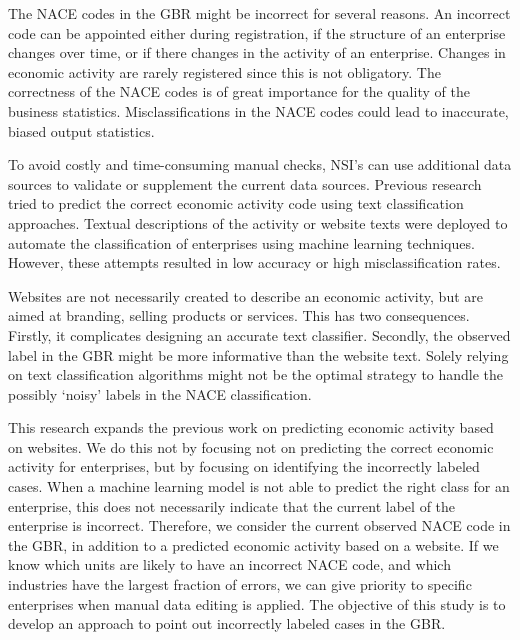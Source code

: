 \documentclass[12pt, a4paper, titlepage]{article}
\begin{document}
The NACE codes in the GBR might be incorrect for several reasons. An incorrect code can be appointed either during registration, if the structure of an enterprise changes over time, or if there changes in the activity of an enterprise. Changes in economic activity are rarely registered \citep{Christensen2008, DeldenScholtusBurger} since this is not obligatory. The correctness of the NACE codes is of great importance for the quality of the business statistics. Misclassifications in the NACE codes could lead to inaccurate, biased output statistics.

To avoid costly and time-consuming manual checks, NSI’s can use additional data sources to validate or supplement the current data sources. Previous research tried to predict the correct economic activity code using text classification approaches. Textual descriptions of the activity \citep{Caterini} or website texts \citep{Roelands, Berardi, Heidi} were deployed to automate the classification of enterprises using machine learning techniques. However, these attempts resulted in low accuracy or high misclassification rates. 

Websites are not necessarily created to describe an economic activity, but are aimed at branding, selling products or services. This has two consequences. Firstly, it complicates designing an accurate text classifier. Secondly, the observed label in the GBR might be more informative than the website text. Solely relying on text classification algorithms might not be the optimal strategy to handle the possibly ‘noisy’ labels in the NACE classification.


This research expands the previous work on predicting economic activity based on websites. We do this not by focusing not on predicting the correct economic activity for enterprises, but by focusing on identifying the incorrectly labeled cases. When a machine learning model is not able to predict the right class for an enterprise, this does not necessarily indicate that the current label of the enterprise is incorrect. Therefore, we consider the current observed NACE code in the GBR, in addition to a predicted economic activity based on a website. If we know which units are likely to have an incorrect NACE code, and which industries have the largest fraction of errors, we can give priority to specific enterprises when manual data editing is applied. The objective of this study is to develop an approach to point out incorrectly labeled cases in the GBR.
\end{document}
